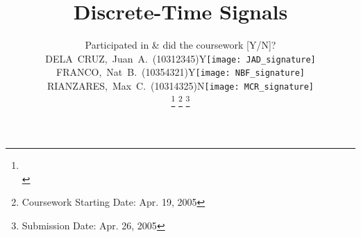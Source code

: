 




\title{Discrete-Time Signals} %

\author{
	{\small
	\begin{tabular}{l l l}
    & \multicolumn{2}{c}{\tiny \textcolor[rgb]{0.9,0.9,0.9}{Participated in \& did the coursework [Y/N]?}} 
    \\ 
		DELA~CRUZ,~Juan~A.~(10312345) & Y & \texttt{[image: JAD\_signature]}
		\\ 
		FRANCO,~Nat~B.~(10354321)     & Y & \texttt{[image: NBF\_signature]}
		\\ 
		RIANZARES,~Max~C.~(10314325)  & N & \texttt{[image: MCR\_signature]}
		\\ 		
	\end{tabular}
	}
\thanks{\CrmD\protect\\} %
 \thanks{Coursework Starting Date: \hspace{1ex} Apr. 19, 2005}
\thanks{Submission Date: \hspace{1ex} Apr. 26, 2005}} 

%
{} %


\maketitle %






